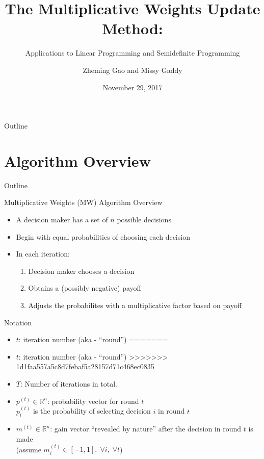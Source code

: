 \documentclass{beamer}
\title[MW Algorithm]{The Multiplicative Weights Update Method:}
\subtitle{Applications to Linear Programming and Semidefinite Programming}
\author[Gao, Gaddy]{Zheming Gao and Missy Gaddy}
\institute{Based on paper by Arora, Hazan, and Kale (2012)}
\date{November 29, 2017}
\begin{document}
\begin{frame}
  \titlepage
\end{frame}
\begin{frame}{Outline}
  \tableofcontents 
\end{frame}

\section{Algorithm Overview}
\begin{frame}{Outline}
  \tableofcontents[currentsection]
\end{frame}

\begin{frame}{Multiplicative Weights (MW) Algorithm Overview}
\begin{itemize}
\item A decision maker has a set of $n$ possible decisions
\item Begin with equal probabilities of choosing each decision
\item In each iteration:
\begin{enumerate}
\setlength\itemsep{1em}
\item Decision maker chooses a decision
\item Obtains a (possibly negative) payoff
\item Adjusts the probabilites with a multiplicative factor based on payoff
\end{enumerate}
\end{itemize}
\end{frame}

\begin{frame}{Notation}
\begin{itemize}
\setlength\itemsep{2em}
<<<<<<< HEAD
\item $t $: iteration number (aka - ``round'') 
=======
\item $t$: iteration number (aka - ``round'') 
>>>>>>> 1d1faa557a5c8d7febaf5a28157d71c468ec0835
\item $T$: Number of iterations in total.

\item $p^{(t)} \in \mathbb{R}^n$: probability vector for round $t$ \\
 $p^{(t)}_i$ is the probability of selecting decision $i$ in round $t$ \\
\item $m^{(t)} \in \mathbb{R}^n$: gain vector ``revealed by nature'' after the decision in round $t$ is made \\
 (assume $m_i^{(t)} \in [-1, 1], \; \forall i, \; \forall t$)
\end{itemize}
\end{frame}
\end{document}
